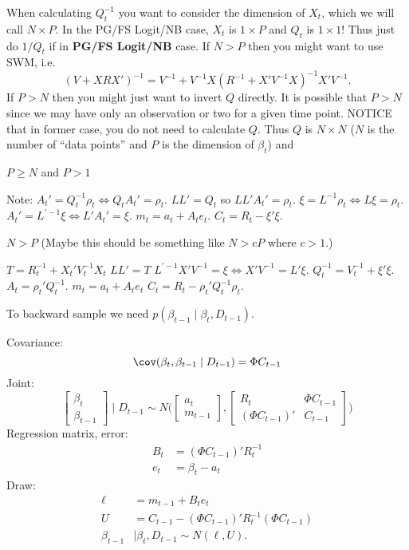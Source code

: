 \documentclass{article}
\begin{document}
When calculating $Q_t^{-1}$ you want to consider the dimension of $X_t$, which
we will call $N \times P$.  In the PG/FS Logit/NB case, $X_t$ is $1 \times P$
and $Q_t$ is $1 \times 1$!  Thus just do $1/Q_t$ if in \textbf{PG/FS Logit/NB}
case.  If $N > P$ then you might want to use SWM, i.e.
\[
(V + XRX')^{-1} = V^{-1} + V^{-1} X(R^{-1} + X'V^{-1}X)^{-1}X' V^{-1}.
\]
If $P > N$ then you might just want to invert $Q$ directly.  It is possible that
$P > N$ since we may have only an observation or two for a given time point.
NOTICE that in former case, you do not need to calculate $Q$.  Thus $Q$ is $N
\times N$ ($N$ is the number of ``data points'' and $P$ is the dimension of
$\beta_t$) and
\begin{outline}
\1 $P \geq N$ and $P > 1$

  \2 Note: $A_t' = Q_t^{-1} \rho_t \iff Q_t A_t' = \rho_t$.
  \2 $L L' = Q_t$ so $LL' A_t' = \rho_t$.
  \2 $\xi = L^{-1} \rho_t \iff L \xi = \rho_t$.
  \2 $A_t' = L^{'-1} \xi \iff L'A_t' = \xi$.
  \2 $m_t = a_t + A_t e_t$.
  \2 $C_t = R_t - \xi' \xi$.

\1 $N > P$ (Maybe this should be something like $N > c P$ where $c > 1$.)

  \2 $T = R_t^{-1} + X_t'V_t^{-1}X_t$
  \2 $LL' = T$
  \2 $L^{'-1} X'V^{-1} = \xi \iff X'V^{-1} = L' \xi$.
  \2 $Q_t^{-1} = V_t^{-1} + \xi' \xi$.
  \2 $A_t = \rho_t' Q_t^{-1}$.
  \2 $m_t = a_t + A_t e_t$
  \2 $C_t = R_t - \rho_t' Q_t^{-1} \rho_t$.

\end{outline}

To backward sample we need $p(\beta_{t-1} \mid \beta_t, D_{t-1})$.
\begin{outline}
\1 Covariance:
\[
\cov(\beta_t, \beta_{t-1} \mid D_{t-1}) = \Phi C_{t-1}
\]
\1 Joint:
\[
\begin{bmatrix}
\beta_t \\ \beta_{t-1}
\end{bmatrix}
\mid D_{t-1}
\sim
N
\Big(
\begin{bmatrix}
a_t \\ m_{t-1}
\end{bmatrix},
\begin{bmatrix}
R_t & \Phi C_{t-1} \\
(\Phi C_{t-1})' & C_{t-1}
\end{bmatrix}
\Big)
\]
\1 Regression matrix, error:
\begin{align*}
B_t & = (\Phi C_{t-1})' R_t^{-1} \\
e_t & = \beta_t - a_t
\end{align*}
\1 Draw:
\begin{align*}
\ell & = m_{t-1} + B_t e_t \\
U & = C_{t-1} - (\Phi C_{t-1})' R_t^{-1} (\Phi C_{t-1}) \\
\beta_{t-1} & \mid \beta_t, D_{t-1} \sim N(\ell, U).
\end{align*}
\end{outline}
\end{document}
